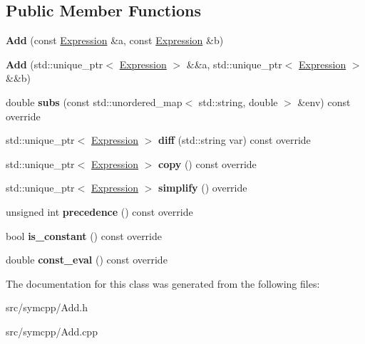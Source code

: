\subsection*{Public Member Functions}
\begin{DoxyCompactItemize}
\item 
{\bfseries Add} (const \hyperlink{classExpression}{Expression} \&a, const \hyperlink{classExpression}{Expression} \&b)\hypertarget{classAdd_aebef5b8c96c82f34869e81ab1a06df81}{}\label{classAdd_aebef5b8c96c82f34869e81ab1a06df81}

\item 
{\bfseries Add} (std\+::unique\+\_\+ptr$<$ \hyperlink{classExpression}{Expression} $>$ \&\&a, std\+::unique\+\_\+ptr$<$ \hyperlink{classExpression}{Expression} $>$ \&\&b)\hypertarget{classAdd_a1633d01be197614fdd556524d5555d17}{}\label{classAdd_a1633d01be197614fdd556524d5555d17}

\item 
double {\bfseries subs} (const std\+::unordered\+\_\+map$<$ std\+::string, double $>$ \&env) const override\hypertarget{classAdd_a0cd2653e925ba27b1d0f7cb0717f5fe6}{}\label{classAdd_a0cd2653e925ba27b1d0f7cb0717f5fe6}

\item 
std\+::unique\+\_\+ptr$<$ \hyperlink{classExpression}{Expression} $>$ {\bfseries diff} (std\+::string var) const override\hypertarget{classAdd_ab401f7161c4f65c954a99ef1baa68c4c}{}\label{classAdd_ab401f7161c4f65c954a99ef1baa68c4c}

\item 
std\+::unique\+\_\+ptr$<$ \hyperlink{classExpression}{Expression} $>$ {\bfseries copy} () const override\hypertarget{classAdd_a839e984f46de608bfe38845d6f61ffc3}{}\label{classAdd_a839e984f46de608bfe38845d6f61ffc3}

\item 
std\+::unique\+\_\+ptr$<$ \hyperlink{classExpression}{Expression} $>$ {\bfseries simplify} () override\hypertarget{classAdd_a69d72a1d9ac42f502e55a8bebc5fe251}{}\label{classAdd_a69d72a1d9ac42f502e55a8bebc5fe251}

\item 
unsigned int {\bfseries precedence} () const override\hypertarget{classAdd_a10139f329ad7f62bed60077cc9eb6d32}{}\label{classAdd_a10139f329ad7f62bed60077cc9eb6d32}

\item 
bool {\bfseries is\+\_\+constant} () const override\hypertarget{classAdd_a1db676c3a96c486b800d6fa18a2809b0}{}\label{classAdd_a1db676c3a96c486b800d6fa18a2809b0}

\item 
double {\bfseries const\+\_\+eval} () const override\hypertarget{classAdd_ae99e88e4e1ca31474da002b59e0a563b}{}\label{classAdd_ae99e88e4e1ca31474da002b59e0a563b}

\end{DoxyCompactItemize}


The documentation for this class was generated from the following files\+:\begin{DoxyCompactItemize}
\item 
src/symcpp/Add.\+h\item 
src/symcpp/Add.\+cpp\end{DoxyCompactItemize}
